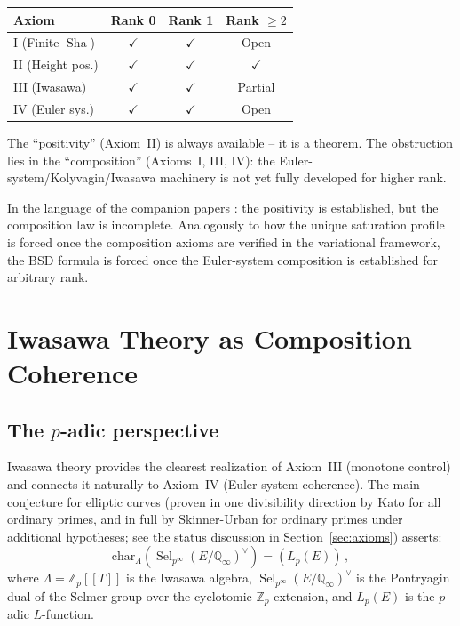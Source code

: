 \documentclass[aps,prd,twocolumn,superscriptaddress,nofootinbib]{revtex4-2}
\theoremstyle{definition}
\theoremstyle{remark}
\DeclareMathOperator{\Sel}{Sel}
\DeclareMathOperator{\Sha}{Sha}
\begin{document}
\begin{center}
\begin{tabular}{lccc}
\toprule
Axiom & Rank 0 & Rank 1 & Rank $\geq 2$ \\
\midrule
I (Finite $\Sha$) & $\checkmark$ & $\checkmark$ & Open \\
II (Height pos.) & $\checkmark$ & $\checkmark$ & $\checkmark$ \\
III (Iwasawa) & $\checkmark$ & $\checkmark$ & Partial \\
IV (Euler sys.) & $\checkmark$ & $\checkmark$ & Open \\
\bottomrule
\end{tabular}
\end{center}

The ``positivity'' (Axiom~II) is always available -- it is a theorem. The obstruction lies in the ``composition'' (Axioms~I, III, IV): the Euler-system/Kolyvagin/Iwasawa machinery is not yet fully developed for higher rank.

In the language of the companion papers \cite{Geiger2026e,FST-Unified2026}: the positivity is established, but the composition law is incomplete. Analogously to how the unique saturation profile is forced once the composition axioms are verified in the variational framework, the BSD formula is forced once the Euler-system composition is established for arbitrary rank.


\section{Iwasawa Theory as Composition Coherence}
\label{sec:iwasawa}

\subsection{The $p$-adic perspective}

Iwasawa theory provides the clearest realization of Axiom~III (monotone control) and connects it naturally to Axiom~IV (Euler-system coherence). The main conjecture for elliptic curves \cite{Kato2004,SkinnerUrban2014} (proven in one divisibility direction by Kato for all ordinary primes, and in full by Skinner-Urban for ordinary primes under additional hypotheses; see the status discussion in Section~\ref{sec:axioms}) asserts:
\begin{equation}
\mathrm{char}_{\Lambda}\!\left(\Sel_{p^\infty}(E/\mathbb{Q}_\infty)^\vee\right) = (L_p(E))\,,
\label{eq:iwasawa_mc}
\end{equation}
where $\Lambda = \mathbb{Z}_p[[T]]$ is the Iwasawa algebra, $\Sel_{p^\infty}(E/\mathbb{Q}_\infty)^\vee$ is the Pontryagin dual of the Selmer group over the cyclotomic $\mathbb{Z}_p$-extension, and $L_p(E)$ is the $p$-adic $L$-function.
\end{document}
